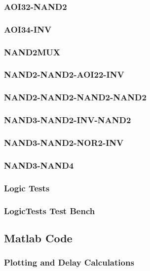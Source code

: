 \documentclass[conference]{IEEEtran}
\begin{document}
  \subsubsection{AOI32-NAND2} \hspace{1mm}
  
  \newpage
  \subsubsection{AOI34-INV} \hspace{1mm}
  
  \newpage
  \subsubsection{NAND2MUX} \hspace{1mm}
  
  \newpage
  \subsubsection{NAND2-NAND2-AOI22-INV} \hspace{1mm}
  
  \newpage
  \subsubsection{NAND2-NAND2-NAND2-NAND2} \hspace{1mm}
  
  \newpage
  \subsubsection{NAND3-NAND2-INV-NAND2} \hspace{1mm}
  
  \newpage
  \subsubsection{NAND3-NAND2-NOR2-INV} \hspace{1mm}
  
  \newpage
  \subsubsection{NAND3-NAND4} \hspace{1mm} 
  
  \newpage
  \subsubsection{Logic Tests}\hspace{1mm}
  
  \newpage
  \subsubsection{LogicTests Test Bench} \hspace{1mm}
  
  \newpage
\subsection{Matlab Code}
  \subsubsection{Plotting and Delay Calculations} \hspace{1mm}
  
  \newpage
\end{document}
